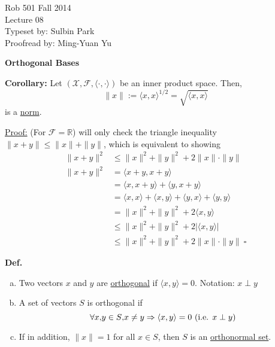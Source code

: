 \documentclass[letterpaper]{article}
\begin{document}
\baselineskip=48pt  %


\setlength{\parskip}{.3in}
\setlength{\itemsep}{.3in}

\pagestyle{plain}

{\Large \bf
\begin{center}
Rob 501 Fall 2014\\
Lecture 08\\
Typeset by: Sulbin Park\\
Proofread by: Ming-Yuan Yu
\end{center}
}

\Large

\begin{center}
\textbf{Orthogonal Bases}
\end{center}

\textbf{Corollary:} Let $(\mathcal{X},\mathcal{F}, \langle \cdot,\cdot \rangle )$ be an inner product space. Then, $$\|x\| :=  \langle x,x \rangle ^{1/2} = \sqrt{ \langle x,x \rangle }$$
is a \underline{norm}.

\underline{Proof:} (For $\mathcal{F} = \mathbb{R}$) will only check the triangle inequality $\|x+y\| \leq \|x\| +\|y\|$, which is equivalent to showing
    \begin{align*}
        \|x+y\|^2 &\leq \|x\|^2 + \|y\|^2 + 2\|x\| \cdot \|y\|\\
        \|x+y\|^2 &=  \langle x+y,x+y \rangle  \\
        &=  \langle x,x+y \rangle  +  \langle y, x+y \rangle  \\
        &=  \langle x,x \rangle  + \langle x,y \rangle  +  \langle y,x \rangle +  \langle y,y \rangle  \\
        &= \|x\|^2 + \|y\|^2 +2 \langle x,y \rangle  \\
        &\leq \|x\|^2 + \|y\|^2 + 2\left| \langle x,y \rangle \right| \\
        &\leq \|x\|^2 + \|y\|^2 + 2\|x\| \cdot \|y\|\ \square
    \end{align*}

\textbf{Def.}
\begin{enumerate}[(a)]
    \item Two vectors $x$ and $y$ are \underline{orthogonal} if $ \langle x,y \rangle =0$. Notation: $x \perp y$
    \item A set of vectors $S$ is orthogonal if $$\forall x \text{,} y \in S \text{,} x \neq y \Rightarrow \langle x,y \rangle =0 \mbox{ (i.e. $ x \perp y$)}$$
    \item If in addition, $\|x\|=1$ for all $x \in S$, then $S$ is an \underline{orthonormal set}.
\end{enumerate}
\end{document}
